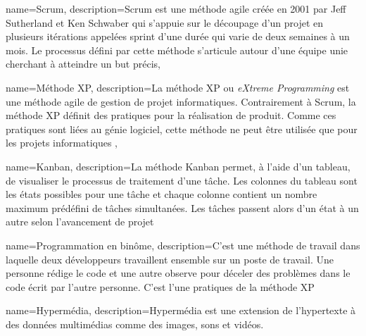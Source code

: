 \documentclass[a4paper,12pt,dvipsnames]{report}
\begin{document}
 

     
     

    \tableofcontents 
    \listoffigures 
    \listoftables

    
    
     
     
     
    

    
    



     { 
        name={Scrum}, 
        description={Scrum est une méthode agile créée en 2001 par Jeff Sutherland et Ken Schwaber qui s'appuie sur le découpage d'un 
            projet en plusieurs itérations appelées sprint d'une durée qui 
            varie de deux semaines à un mois. Le processus défini par cette 
            méthode s'articule autour d'une équipe unie cherchant à atteindre 
            un but précis}, 
        }

 { 
    name={M\'ethode XP}, 
    description={La méthode XP ou \textit{eXtreme Programming} est une méthode 
        agile de gestion de projet informatiques. Contrairement à Scrum, la 
        méthode XP définit des pratiques pour la réalisation de produit. Comme 
        ces pratiques sont liées au génie logiciel, cette méthode ne peut être 
        utilisée que pour les projets informatiques },
    }

 { 
    name={Kanban}, 
    description={La méthode Kanban permet, à l'aide d'un tableau, de visualiser 
        le processus de traitement d'une tâche. Les colonnes du tableau sont les 
        états possibles pour une tâche et chaque colonne contient un nombre 
        maximum prédéfini de tâches simultanées. Les tâches passent alors d'un 
        état à un autre selon l'avancement de projet}
    }

 { 
    name={Programmation en binôme},
    description={C'est une méthode de travail dans laquelle deux développeurs
        travaillent ensemble sur un poste de travail. Une personne rédige le 
        code et une autre observe pour déceler des problèmes dans le code écrit 
        par l'autre personne. C'est l'une pratiques de la méthode XP}
    }

 { 
    name={Hyperm\'edia}, 
    description={Hypermédia est une extension de l'hypertexte à des données 
        multimédias comme des images, sons et vidéos.}
    }
\end{document}
